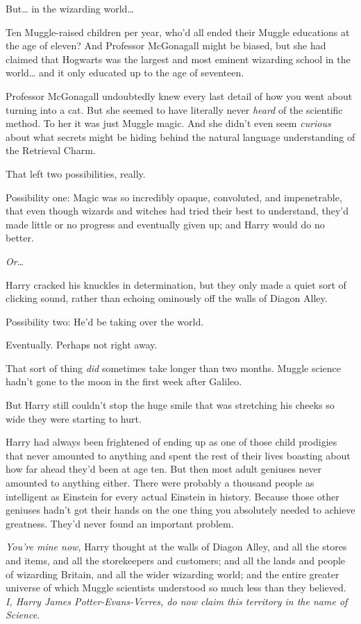 But{\ldots} in the wizarding world{\ldots}

Ten Muggle-raised children per year, who'd all ended their Muggle educations at the age of eleven? And Professor McGonagall might be biased, but she had claimed that Hogwarts was the largest and most eminent wizarding school in the world{\ldots} and it only educated up to the age of seventeen.

Professor McGonagall undoubtedly knew every last detail of how you went about turning into a cat. But she seemed to have literally never \emph{heard} of the scientific method. To her it was just Muggle magic. And she didn't even seem \emph{curious} about what secrets might be hiding behind the natural language understanding of the Retrieval Charm.

That left two possibilities, really.

Possibility one: Magic was so incredibly opaque, convoluted, and impenetrable, that even though wizards and witches had tried their best to understand, they'd made little or no progress and eventually given up; and Harry would do no better.

\emph{Or}{\ldots}

Harry cracked his knuckles in determination, but they only made a quiet sort of clicking sound, rather than echoing ominously off the walls of Diagon Alley.

Possibility two: He'd be taking over the world.

Eventually. Perhaps not right away.

That sort of thing \emph{did} sometimes take longer than two months. Muggle science hadn't gone to the moon in the first week after Galileo.

But Harry still couldn't stop the huge smile that was stretching his cheeks so wide they were starting to hurt.

Harry had always been frightened of ending up as one of those child prodigies that never amounted to anything and spent the rest of their lives boasting about how far ahead they'd been at age ten. But then most adult geniuses never amounted to anything either. There were probably a thousand people as intelligent as Einstein for every actual Einstein in history. Because those other geniuses hadn't got their hands on the one thing you absolutely needed to achieve greatness. They'd never found an important problem.

\emph{You're mine now,} Harry thought at the walls of Diagon Alley, and all the stores and items, and all the storekeepers and customers; and all the lands and people of wizarding Britain, and all the wider wizarding world; and the entire greater universe of which Muggle scientists understood so much less than they believed. \emph{I, Harry James Potter-Evans-Verres, do now claim this territory in the name of Science.}

